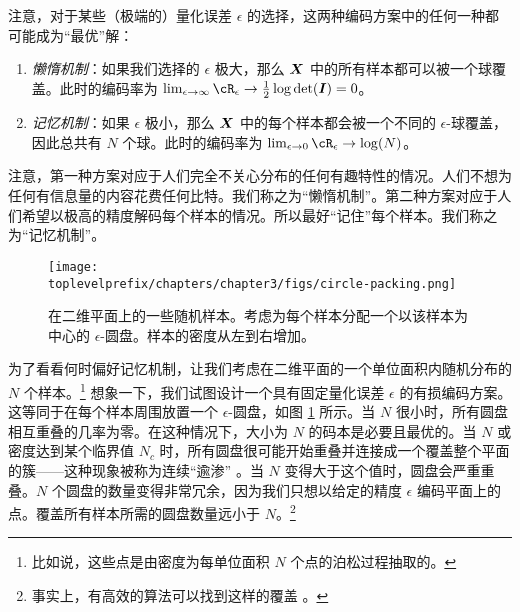 \documentclass[../../book-main.tex]{subfiles}
\begin{document}
注意，对于某些（极端的）量化误差 $\epsilon$ 的选择，这两种编码方案中的任何一种都可能成为“最优”解：
\begin{enumerate}
	\item {\em 懒惰机制}：如果我们选择的 $\epsilon$ 极大，那么 $\bm{X}$ 中的所有样本都可以被一个球覆盖。此时的编码率为 $\lim_{\epsilon \rightarrow \infty} \cR_\epsilon \rightarrow \frac{1}{2}\log\det (\boldsymbol{I}) = 0$。
	\item {\em 记忆机制}：如果 $\epsilon$ 极小，那么 $\bm{X}$ 中的每个样本都会被一个不同的 $\epsilon$-球覆盖，因此总共有 $N$ 个球。此时的编码率为 $\lim_{\epsilon \rightarrow 0} \cR_\epsilon \rightarrow \log(N)$。
\end{enumerate}
注意，第一种方案对应于人们完全不关心分布的任何有趣特性的情况。人们不想为任何有信息量的内容花费任何比特。我们称之为“懒惰机制”。第二种方案对应于人们希望以极高的精度解码每个样本的情况。所以最好“记住”每个样本。我们称之为“记忆机制”。
\begin{figure}
	\centering
	\texttt{[image: \\toplevelprefix/chapters/chapter3/figs/circle-packing.png]}
	\caption{在二维平面上的一些随机样本。考虑为每个样本分配一个以该样本为中心的 $\epsilon$-圆盘。样本的密度从左到右增加。}
	\label{fig:circle-packing}
\end{figure}
\begin{example}
	为了看看何时偏好记忆机制，让我们考虑在二维平面的一个单位面积内随机分布的 $N$ 个样本。\footnote{比如说，这些点是由密度为每单位面积 $N$ 个点的泊松过程抽取的。} 想象一下，我们试图设计一个具有固定量化误差 $\epsilon$ 的有损编码方案。这等同于在每个样本周围放置一个 $\epsilon$-圆盘，如图 \ref{fig:circle-packing} 所示。当 $N$ 很小时，所有圆盘相互重叠的几率为零。在这种情况下，大小为 $N$ 的码本是必要且最优的。当 $N$ 或密度达到某个临界值 $N_c$ 时，所有圆盘很可能开始重叠并连接成一个覆盖整个平面的簇——这种现象被称为连续“逾渗” \cite{Gilbert-1961,Mertens-Moore-2012}。当 $N$ 变得大于这个值时，圆盘会严重重叠。$N$ 个圆盘的数量变得非常冗余，因为我们只想以给定的精度 $\epsilon$ 编码平面上的点。覆盖所有样本所需的圆盘数量远小于 $N$。\footnote{事实上，有高效的算法可以找到这样的覆盖 \cite{Booth-2001}。}
\end{example}
\end{document}
